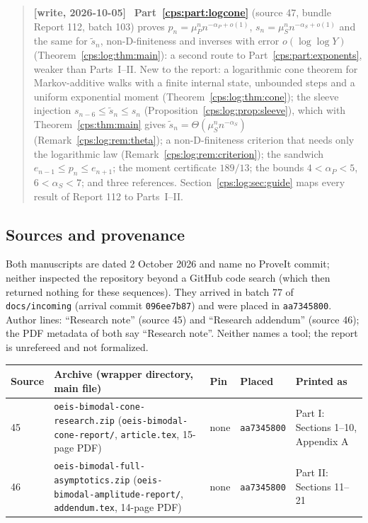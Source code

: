 \documentclass[11pt,letterpaper]{article}
\numberwithin{equation}{section}
\theoremstyle{remark}\newtheorem{remark}[theorem]{Remark}
\newenvironment{writenotelog}{\begin{quote}\small\sloppy\textbf{[write, 2026-10-05]}\ }{\end{quote}}
\begin{document}
\begin{writenotelog}
\textbf{Part~\ref{cps:part:logcone}} (source 47, bundle Report 112, batch 103) proves
$p_n=\mu_P^nn^{-\alpha_P+o(1)}$, $s_n=\mu_S^nn^{-\alpha_S+o(1)}$ and the same for $\widetilde s_n$,
non-D-finiteness and inverses with error $o(\log\log Y)$ (Theorem~\ref{cps:log:thm:main}): a
second route to Part~\ref{cps:part:exponents}, weaker than Parts~I--II. New to the report: a
logarithmic cone theorem for Markov-additive walks with a finite internal state, unbounded steps
and a uniform exponential moment (Theorem~\ref{cps:log:thm:cone}); the sleeve injection
$s_{n-6}\le\widetilde s_n\le s_n$ (Proposition~\ref{cps:log:prop:sleeve}), which with
Theorem~\ref{cps:thm:main} gives $\widetilde s_n=\Theta(\mu_S^nn^{-\alpha_S})$
(Remark~\ref{cps:log:rem:theta}); a non-D-finiteness criterion that needs only the logarithmic
law (Remark~\ref{cps:log:rem:criterion}); the sandwich $e_{n-1}\le p_n\le e_{n+1}$; the moment
certificate $189/13$; the bounds $4<\alpha_P<5$, $6<\alpha_S<7$; and three references.
Section~\ref{cps:log:sec:guide} maps every result of Report 112 to Parts~I--II.
\end{writenotelog}

\subsection*{Sources and provenance}
Both manuscripts are dated 2 October 2026 and name no ProveIt commit; neither inspected the
repository beyond a GitHub code search (which then returned nothing for these sequences). They
arrived in batch 77 of \texttt{docs/incoming} (arrival commit \texttt{096ee7b87}) and were placed
in \texttt{aa7345800}. Author lines: ``Research note'' (source 45) and ``Research addendum''
(source 46); the PDF metadata of both say ``Research note''. Neither names a tool; the report is
unrefereed and not formalized.

\begin{center}\small
\begin{tabular}{@{}l>{\raggedright}p{}ll>{\raggedright\arraybackslash}p{}@{}}
\toprule
Source & Archive (wrapper directory, main file) & Pin & Placed & Printed as\\
\midrule
45 & \texttt{oeis-bimodal-cone-research.zip} (\texttt{oeis-bimodal-cone-report/}, \texttt{article.tex}, 15-page PDF) & none & \texttt{aa7345800} & Part I: Sections 1--10, Appendix A\\
46 & \texttt{oeis-bimodal-full-asymptotics.zip} (\texttt{oeis-bimodal-amplitude-report/}, \texttt{addendum.tex}, 14-page PDF) & none & \texttt{aa7345800} & Part II: Sections 11--21\\
\bottomrule
\end{tabular}
\end{center}
\end{document}
